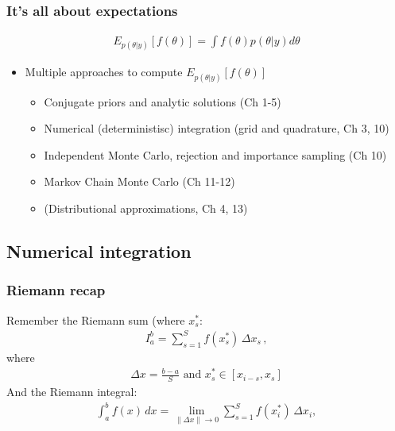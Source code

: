 \documentclass[10pt]{beamer}
\begin{document}
\begin{frame}


\frametitle{It's all about expectations}

   \begin{align*}
   E_{p(\theta|y)}[f(\theta)] = \int f(\theta) p(\theta|y) d\theta
   \end{align*}

  \begin{itemize}
  \item Multiple approaches to compute $E_{p(\theta|y)}[f(\theta)]$
  \begin{itemize}
  \item Conjugate priors and analytic solutions (Ch 1-5)
  \pause
  \item Numerical (deterministisc) integration (grid and quadrature, Ch 3, 10)
  \pause
  \item Independent Monte Carlo, rejection and importance sampling (Ch 10)
  \pause
  \item Markov Chain Monte Carlo (Ch 11-12)
  \pause
  \item (Distributional approximations, Ch 4, 13)
  \end{itemize}
  \end{itemize}

 \end{frame}

\subsection{Numerical integration}
\frame{\subsectionpage}

\begin{frame}
\frametitle{Riemann recap}


  Remember the Riemann sum (where $x_{s}^{*}$:
     \begin{align*}
     {\displaystyle I_{a}^{b}=\sum _{s=1}^{S}f(x_{s}^{*})\,\Delta x_{s}\,,}
       \end{align*}
      where
      \begin{align*}
      {\displaystyle \Delta x={\frac {b-a}{S}} \text{ and } {\displaystyle x_{s}^{*}\in [x_{i-s},x_{s}]}}
      \end{align*}
       \pause
  And the Riemann integral:
        \begin{align*}
         {\displaystyle \int _{a}^{b}f(x)\,dx=\lim _{\|\Delta x\|\rightarrow 0}\sum _{s=1}^{S}f(x_{i}^{*})\,\Delta x_{i},}
    \end{align*}


\end{frame}
\end{document}
